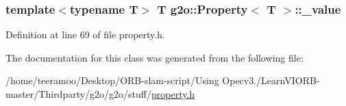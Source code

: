 \subsubsection[{\texorpdfstring{\+\_\+value}{_value}}]{\setlength{\rightskip}{0pt plus 5cm}template$<$typename T$>$ T {\bf g2o\+::\+Property}$<$ T $>$\+::\+\_\+value\hspace{0.3cm}{\ttfamily [protected]}}\hypertarget{classg2o_1_1Property_ae51b1fe0e0a1f0d9a2bcbef7ea3afcf7}{}\label{classg2o_1_1Property_ae51b1fe0e0a1f0d9a2bcbef7ea3afcf7}


Definition at line 69 of file property.\+h.



The documentation for this class was generated from the following file\+:\begin{DoxyCompactItemize}
\item 
/home/teeramoo/\+Desktop/\+O\+R\+B-\/slam-\/script/\+Using Opecv3./\+Learn\+V\+I\+O\+R\+B-\/master/\+Thirdparty/g2o/g2o/stuff/\hyperlink{property_8h}{property.\+h}\end{DoxyCompactItemize}
